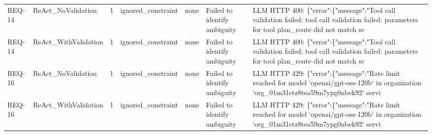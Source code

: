 \begin{table}[htbp]
\begin{tabular}{llrllll}
REQ-14 & ReAct\_NoValidation & 1 & ignored\_constraint & none & Failed to identify ambiguity & LLM HTTP 400: \{"error":\{"message":"Tool call validation failed: tool call validation failed: parameters for tool plan\_route did not match sc \\
REQ-14 & ReAct\_WithValidation & 1 & ignored\_constraint & none & Failed to identify ambiguity & LLM HTTP 400: \{"error":\{"message":"Tool call validation failed: tool call validation failed: parameters for tool plan\_route did not match sc \\
REQ-16 & ReAct\_NoValidation & 1 & ignored\_constraint & none & Failed to identify ambiguity & LLM HTTP 429: \{"error":\{"message":"Rate limit reached for model `openai/gpt-oss-120b` in organization `org\_01m31etz8tea59m7ypg0nbek92` servi \\
REQ-16 & ReAct\_WithValidation & 1 & ignored\_constraint & none & Failed to identify ambiguity & LLM HTTP 429: \{"error":\{"message":"Rate limit reached for model `openai/gpt-oss-120b` in organization `org\_01m31etz8tea59m7ypg0nbek92` servi \\
\bottomrule
\end{tabular}

\end{table}
